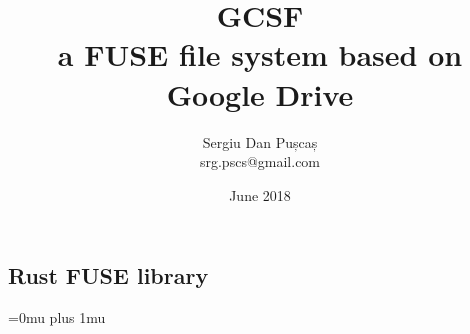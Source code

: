 \documentclass[a4paper,12pt,titlepage,openany]{book}
\title{%
GCSF \\
\large a FUSE file system based on Google Drive}
\author{Sergiu Dan Pușcaș \\ srg.pscs@gmail.com}
\date{June 2018}
\begin{document}

\maketitle
\tableofcontents








\begin{appendices}
% 

% 

\chapter{Rust FUSE library} \label{appendix:rust_fuse}

\end{appendices}

\Urlmuskip=0mu plus 1mu\relax


\end{document}
